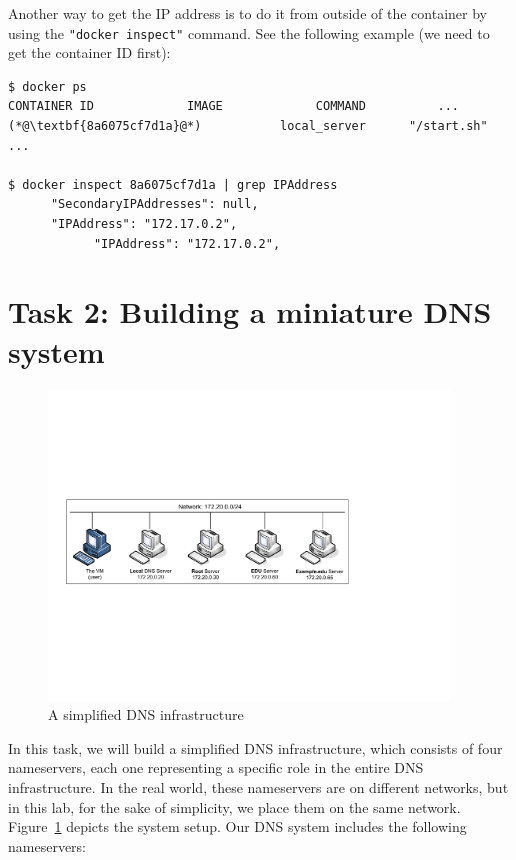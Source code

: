  
Another way to get the IP address is to do it from outside of the container
by using the \texttt{"docker inspect"} command. See the 
following example (we need to get the container ID first):

\begin{lstlisting}
$ docker ps
CONTAINER ID             IMAGE             COMMAND          ...
(*@\textbf{8a6075cf7d1a}@*)           local_server      "/start.sh"        ...

$ docker inspect 8a6075cf7d1a | grep IPAddress
      "SecondaryIPAddresses": null,
      "IPAddress": "172.17.0.2",
            "IPAddress": "172.17.0.2",
\end{lstlisting}
 




\section{Task 2: Building a miniature DNS system}

\begin{figure}[htb]
\begin{center}
\includegraphics[width=0.95\textwidth]{Figs/DNS-in-a-box.pdf}
\end{center}
\caption{A simplified DNS infrastructure}
\label{dns:fig:dns-in-a-box}
\end{figure}


In this task, we will build a simplified DNS infrastructure, which 
consists of four nameservers, each one representing 
a specific role in the entire DNS infrastructure. 
In the real world, these nameservers are on different 
networks, but in this lab, for the sake of simplicity, we place them
on the same network. Figure~\ref{dns:fig:dns-in-a-box} depicts the system setup. 
Our DNS system includes the following nameservers: 

